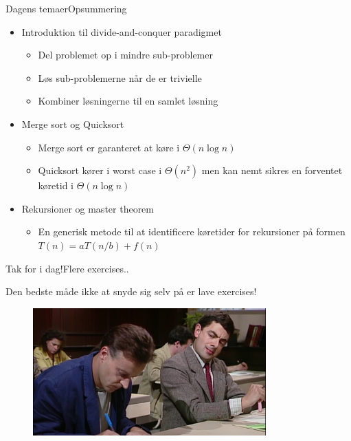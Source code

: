 \documentclass[aspectratio=1610]{beamer}
\begin{document}
\begin{frame}{Dagens temaer}{Opsummering}
    \begin{itemize}
        \item Introduktion til \alert{divide-and-conquer} paradigmet
            \begin{itemize}
                \item Del problemet op i mindre sub-problemer
                \item Løs sub-problemerne når de er trivielle
                \item Kombiner løsningerne til en samlet løsning
            \end{itemize}
        \item Merge sort og Quicksort
            \begin{itemize}
                \item Merge sort er garanteret at køre i $\Theta(n \log n)$
                \item Quicksort kører i worst case i $\Theta(n^2)$ men kan nemt
                    sikres en forventet køretid i $\Theta(n \log n)$
            \end{itemize}
        \item Rekursioner og master theorem
            \begin{itemize}
                \item En generisk metode til at identificere køretider for
                    rekursioner på formen $T(n) = aT(n/b) + f(n)$
            \end{itemize}
    \end{itemize}
\end{frame}


\begin{frame}{Tak for i dag!}{Flere exercises..}

    Den bedste måde ikke at snyde sig selv på er lave exercises!

    \begin{figure}[h]
        \centering
        \includegraphics[width=0.8\textwidth]{exercises}
    \end{figure}
    
\end{frame}
\end{document}
